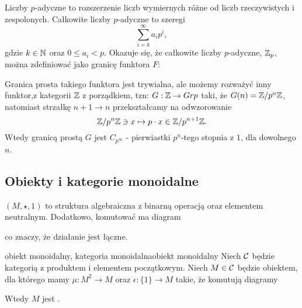 {\begin{example}
  Liczby $p$-adyczne to rozszerzenie liczb wymiernych różne od liczb rzeczywistych i zespolonych. Całkowite liczby $p$-adyczne to szeregi
  $$\sum_{i=k}^\infty a_ip^i,$$
  gdzie $k\in\mathbb{N}$ oraz $0\leq a_i < p$. Okazuje się, że całkowite liczby $p$-adyczne, $\mathbb{Z}_p$, można zdefiniować jako granicę funktora $F$:
  \begin{center}
  \end{center}
  Granica prosta takiego funktora jest trywialna, ale możemy rozważyć inny funktor,z kategorii $\mathbb{Z}$ z porządkiem, tzn: $G:\mathbb{Z}\to Grp$ taki, że $G(n)=\mathbb{Z}/p^n\mathbb{Z}$, natomiast strzałkę $n+1\to n$ przekształcamy na odwzorowanie
  $$\mathbb{Z}/p^n\mathbb{Z}\ni x\mapsto p\cdot x\in \mathbb{Z}/p^{n+1}\mathbb{Z}.$$
  Wtedy granicą prostą $G$ jest $C_{p^\infty}$ - pierwiastki $p^n$-tego stopnia z $1$, dla dowolnego $n$. 
\end{example}

\subsection{Obiekty i kategorie monoidalne}

 $(M, \star, 1)$ to struktura algebraiczna z binarną operacją oraz elementem neutralnym. Dodatkowo, komutować ma diagram 
\begin{center}
\end{center}
co znaczy, że działanie jest łączne.

\begin{definition}{obiekt monoidalny, kategoria monoidalna}{obiekt monoidalny}
  Niech $\mathcal{C}$ będzie kategorią z produktem i elementem początkowym. Niech $M\in \mathcal{C}$ będzie obiektem, dla którego mamy $\mu:M^2\to M$ oraz $\epsilon: \{1\}\to M$ takie, że komutują diagramy
  \begin{center}
  \end{center}
  \begin{center}
  \end{center}
  Wtedy $M$ jest .
  

\end{definition}}
